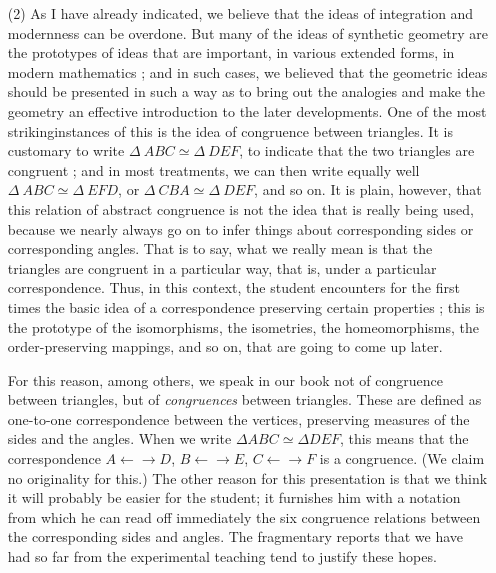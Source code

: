 \begin{itemize}
\item[(2)] As I have already indicated, we believe that the ideas of
  integration and modernness can be overdone. But many of the ideas of
  synthetic geometry are the prototypes of ideas that are important,
  in various extended forms, in modern mathematics ; and in such
  cases, we believed that the geometric ideas should be presented in
  such a way as to bring out the analogies and make the geometry an
  effective introduction to the later developments. One of the most
  striking\pageoriginale instances of this is the idea of congruence
  between triangles. It is customary to write $\Delta ~ABC \simeq
  \Delta ~DEF$, to indicate that the two triangles are congruent ; and
  in most treatments, we can then write equally well $\Delta ~ABC
  \simeq \Delta ~EFD$, or $\Delta~ CBA \simeq \Delta ~ DEF$, and so
  on. It is plain, however, that this relation of abstract congruence
  is not the idea that is really being used, because we nearly always
  go on to infer things about corresponding sides or corresponding
  angles. That is to say, what we really mean is that the triangles
  are congruent in a particular way, that is, under a particular
  correspondence. Thus, in this context, the student encounters for
  the first times the basic idea of a correspondence preserving
  certain properties ; this is the prototype of the isomorphisms, the
  isometries, the homeomorphisms, the order-preserving mappings, and
  so on, that are going to come up later.

For this reason, among others, we speak in our book not of congruence
between triangles, but of \textit{congruences} between
triangles. These are defined as one-to-one correspondence between the
vertices, preserving measures of the sides and the angles. When we
write $\Delta ABC \simeq \Delta DEF$, this means that the
correspondence $A \leftarrow \rightarrow D$, $B \leftarrow \rightarrow
E$, $C \leftarrow \rightarrow F$ is a congruence. (We claim no
originality for this.) The other reason for this presentation is that
we think it will  probably be easier for the student; it furnishes him
with a notation from which he can read off immediately the six
congruence relations between the corresponding sides and angles. The
fragmentary reports that we have had so far from the experimental
teaching tend to justify these hopes.


\end{itemize}
